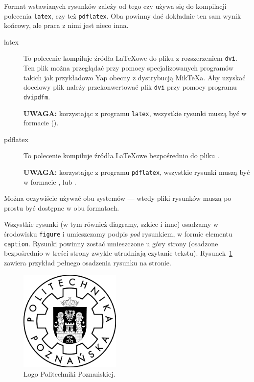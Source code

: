 Format wstawianych rysunków zależy od tego czy używa się do kompilacji polecenia
\texttt{latex}, czy też \texttt{pdflatex}. Oba powinny dać dokładnie ten sam wynik końcowy,
ale praca z nimi jest nieco inna.

\begin{description}
    \item[latex] To polecenie kompiluje źródła \LaTeX{}owe do pliku 
        z rozszerzeniem \texttt{dvi}. Ten plik można przeglądać przy pomocy specjalizowanych programów
        takich jak przykładowo Yap obecny z dystrybucją Mik\TeX{}a. Aby uzyskać docelowy plik 
        należy przekonwertować plik \texttt{dvi} przy pomocy programu \texttt{dvipdfm}. 
        
        \textbf{UWAGA:} korzystając z programu \texttt{latex}, wszystkie rysunki muszą być w formacie 
        ().

    \item[pdflatex] To polecenie kompiluje źródła \LaTeX{}owe bezpośrednio do pliku .
    
        \textbf{UWAGA:} korzystając z programu \texttt{pdflatex}, wszystkie rysunki muszą być w formacie ,
         lub .
\end{description}

Można oczywiście używać obu systemów --- wtedy pliki rysunków muszą po prostu być dostępne w obu formatach.

Wszystkie rysunki (w tym również diagramy, szkice i inne) osadzamy w środowisku 
\texttt{figure} i umieszczamy podpis \emph{pod} rysunkiem, w formie elementu \texttt{caption}. Rysunki powinny
zostać umieszczone u góry strony (osadzone bezpośrednio w treści strony zwykle utrudniają czytanie tekstu).
Rysunek~\ref{rys:plama} zawiera przykład pełnego osadzenia rysunku na stronie.

\begin{figure}[t] %
\centering\includegraphics[width=5cm]{figures/template/logo-pp}
\caption{Logo Politechniki Poznańskiej.}\label{rys:plama}
\end{figure}

